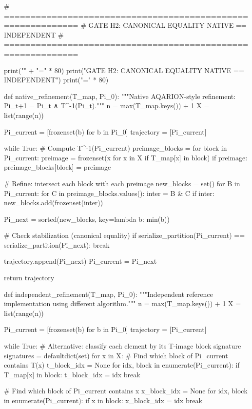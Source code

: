 # ============================================================
# GATE H2: CANONICAL EQUALITY NATIVE == INDEPENDENT
# ============================================================

print("\n" + "=" * 80)
print("GATE H2: CANONICAL EQUALITY NATIVE == INDEPENDENT")
print("=" * 80)

def native_refinement(T_map, Pi_0):
    """Native AQARION-style refinement: Pi_{t+1} = Pi_t ∧ T^{-1}(Pi_t)."""
    n = max(T_map.keys()) + 1
    X = list(range(n))
    
    Pi_current = [frozenset(b) for b in Pi_0]
    trajectory = [Pi_current]
    
    while True:
        # Compute T^{-1}(Pi_current)
        preimage_blocks = {}
        for block in Pi_current:
            preimage = frozenset({x for x in X if T_map[x] in block})
            if preimage:
                preimage_blocks[block] = preimage
        
        # Refine: intersect each block with each preimage
        new_blocks = set()
        for B in Pi_current:
            for C in preimage_blocks.values():
                inter = B & C
                if inter:
                    new_blocks.add(frozenset(inter))
        
        Pi_next = sorted(new_blocks, key=lambda b: min(b))
        
        # Check stabilization (canonical equality)
        if serialize_partition(Pi_current) == serialize_partition(Pi_next):
            break
        
        trajectory.append(Pi_next)
        Pi_current = Pi_next
    
    return trajectory

def independent_refinement(T_map, Pi_0):
    """Independent reference implementation using different algorithm."""
    n = max(T_map.keys()) + 1
    X = list(range(n))
    
    Pi_current = [frozenset(b) for b in Pi_0]
    trajectory = [Pi_current]
    
    while True:
        # Alternative: classify each element by its T-image block signature
        signatures = defaultdict(set)
        for x in X:
            # Find which block of Pi_current contains T(x)
            t_block_idx = None
            for idx, block in enumerate(Pi_current):
                if T_map[x] in block:
                    t_block_idx = idx
                    break
            
            # Find which block of Pi_current contains x
            x_block_idx = None
            for idx, block in enumerate(Pi_current):
                if x in block:
                    x_block_idx = idx
                    break
            
